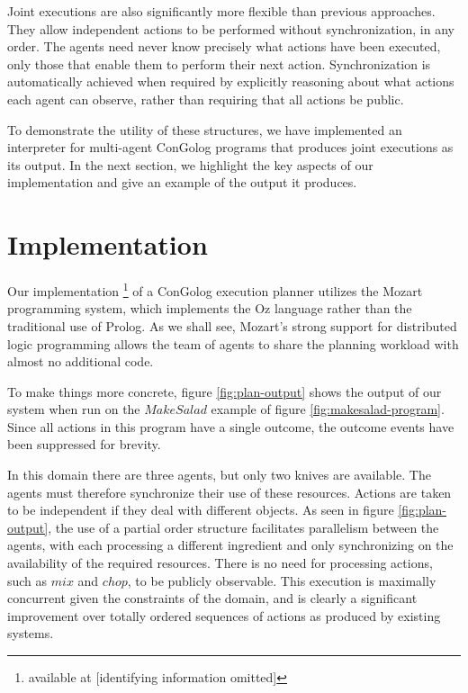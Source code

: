 Joint executions are also significantly more flexible than previous
approaches. They allow independent actions to be performed without
synchronization, in any order. The agents need never know precisely
what actions have been executed, only those that enable them to perform
their next action. Synchronization is automatically achieved when
required by explicitly reasoning about what actions each agent can
observe, rather than requiring that all actions be public.

To demonstrate the utility of these structures, we have implemented
an interpreter for multi-agent ConGolog programs that produces joint
executions as its output. In the next section, we highlight the key
aspects of our implementation and give an example of the output it
produces.


\section{Implementation}

\label{sec:Implementation}

Our implementation%
\footnote{available at {[}identifying information omitted]%
} of a ConGolog execution planner utilizes the Mozart programming system,
which implements the Oz language \citep{vanroy99mozart} rather than
the traditional use of Prolog. As we shall see, Mozart's strong support
for distributed logic programming allows the team of agents to share
the planning workload with almost no additional code.

To make things more concrete, figure \ref{fig:plan-output} shows
the output of our system when run on the $MakeSalad$ example of figure
\ref{fig:makesalad-program}. Since all actions in this program have
a single outcome, the outcome events have been suppressed for brevity.

In this domain there are three agents, but only two knives are available.
The agents must therefore synchronize their use of these resources.
Actions are taken to be independent if they deal with different objects.
As seen in figure \ref{fig:plan-output}, the use of a partial order
structure facilitates parallelism between the agents, with each processing
a different ingredient and only synchronizing on the availability
of the required resources. There is no need for processing actions,
such as $mix$ and $chop$, to be publicly observable. This execution
is maximally concurrent given the constraints of the domain, and is
clearly a significant improvement over totally ordered sequences of
actions as produced by existing systems.

